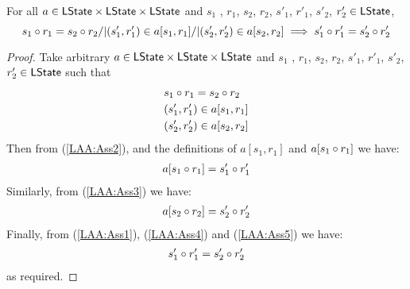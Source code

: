 \begin{lemma}\label{lem:action-application}
%
For all $a \in \textsf{LState} \times \textsf{LState} \times \textsf{LState}$ and $s_1$ , $r_1$, $s_2$, $r_2$, $s'_1$, $r'_1$, $s'_2$, $r'_2 \in \textsf{LState}$,
\[
	s_1 \circ r_1 = s_2 \circ r_2 /| (s'_1, r'_1) \in a[s_1, r_1] /| (s'_2, r'_2) \in a[s_2, r_2] \implies s'_1 \circ r'_1 = s'_2 \circ r'_2 
\]
%
\begin{proof}
Take arbitrary $a \in \textsf{LState} \times \textsf{LState} \times \textsf{LState}$ and $s_1$ , $r_1$, $s_2$, $r_2$, $s'_1$, $r'_1$, $s'_2$, $r'_2 \in \textsf{LState}$ such that 
%
\begin{align}
	& s_1 \circ r_1 = s_2 \circ r_2 \label{LAA:Ass1}\\
	& (s'_1, r'_1) \in a[s_1, r_1] \label{LAA:Ass2}\\
	& (s'_2, r'_2) \in a[s_2, r_2] \label{LAA:Ass3}
\end{align}
%
Then from (\ref{LAA:Ass2}), and the definitions of $a[s_1, r_1]$ and $a[s_1 \circ r_1]$ we have:
%
\begin{align}
	a[s_1 \circ r_1] = s'_1 \circ r'_1 \label{LAA:Ass4}
\end{align}
%
Similarly, from (\ref{LAA:Ass3}) we have:
%
\begin{align}
	a[s_2 \circ r_2] = s'_2 \circ r'_2 \label{LAA:Ass5}
\end{align}
%
Finally, from (\ref{LAA:Ass1}), (\ref{LAA:Ass4}) and (\ref{LAA:Ass5}) we have:
%
\begin{align*}
	s'_1 \circ r'_1 = s'_2 \circ r'_2 
\end{align*}
%
as required.
\end{proof}
%
\end{lemma}
%
%
